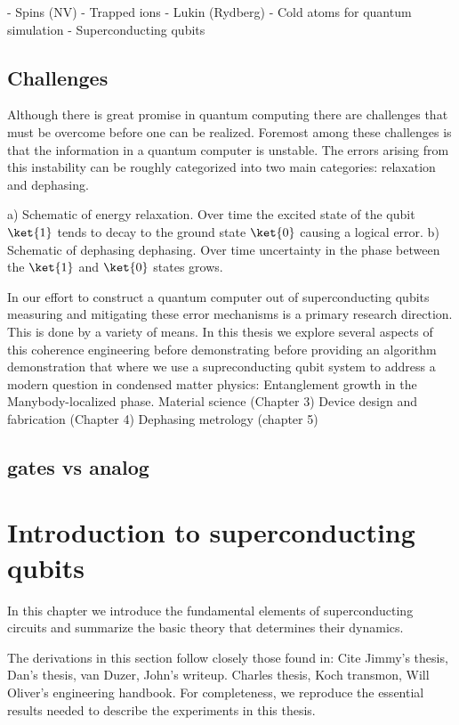- Spins (NV)
- Trapped ions
- Lukin (Rydberg)
- Cold atoms for quantum simulation
- Superconducting qubits

\section{Challenges}
Although there is great promise in quantum computing there are challenges that must be overcome before one can be realized.
Foremost among these challenges is that the information in a quantum computer is unstable.
The errors arising from this instability can be roughly categorized into two main categories: relaxation and dephasing.

{
a) Schematic of energy relaxation.  Over time the excited state of the qubit $\ket{1}$ tends to decay to the ground state $\ket{0}$ causing a logical error.
b) Schematic of dephasing dephasing.  Over time uncertainty in the phase between the $\ket{1}$ and $\ket{0}$ states grows.
}
{}

In our effort to construct a quantum computer out of superconducting qubits measuring and mitigating these error mechanisms is a primary research direction.
This is done by a variety of means.
In this thesis we explore several aspects of this coherence engineering before demonstrating before providing an algorithm demonstration that where we
use a supreconducting qubit system to address a modern question in condensed matter physics: Entanglement growth in the Manybody-localized phase.
Material science (Chapter 3)
Device design and fabrication (Chapter 4)
Dephasing metrology (chapter 5)

\section{gates vs analog}

\chapter{Introduction to superconducting qubits}
In this chapter we introduce the fundamental elements of superconducting circuits and summarize the basic theory that determines their dynamics.

The derivations in this section follow closely those found in:
Cite Jimmy's thesis, Dan's thesis, van Duzer, John's writeup.  Charles thesis, Koch transmon, Will Oliver's engineering handbook.
For completeness, we reproduce the essential results needed to describe the experiments in this thesis.

